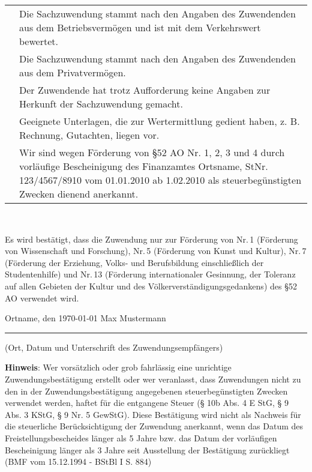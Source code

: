 \documentclass[12pt,ngerman]{scrartcl}
\newcommand{\yes}{\scalebox{1.5}{\XBox}} %
\newcommand{\no}{\scalebox{1.5}{\Square}}
\newcommand{\MyFormBox}[3][1.0cm]{%
    \begin{mdframed}[style=MyFormStyle]%
    {\noindent\footnotesize#2 \vspace*{1em} \par\normalsize #3}\vspace*{#1}%
    \end{mdframed}%
}
\begin{document}
{\footnotesize
\begin{tabular}{cp{}}
\hspace{1em} \yes & Die Sachzuwendung stammt nach den Angaben des Zuwendenden aus dem Betriebsvermögen und ist mit dem Verkehrswert bewertet.  \\
\hspace{1em} \no & Die Sachzuwendung stammt nach den Angaben des Zuwendenden aus dem Privatvermögen.  \\
\hspace{1em} \no & Der Zuwendende hat trotz Aufforderung keine Angaben zur Herkunft der Sachzuwendung gemacht. \\
\hspace{1em} \yes & Geeignete Unterlagen, die zur Wertermittlung gedient haben, z. B. Rechnung, Gutachten, liegen vor. \\
\hspace{1em} \yes & Wir sind wegen Förderung von §52 AO Nr. 1, 2, 3 und 4 durch vorläufige Bescheinigung des Finanzamtes Ortsname, StNr. 123/4567/8910 vom 01.01.2010 ab 1.02.2010 als steuerbegünstigten Zwecken dienend anerkannt. 
\end{tabular}}

\MyFormBox[0.1cm]{~}%
{
Es wird bestätigt, dass die Zuwendung nur zur Förderung von Nr.\,1 (Förderung von Wissenschaft und Forschung), Nr.\,5 (Förderung von Kunst und Kultur), Nr.\,7 (Förderung der Erziehung, Volks- und Berufsbildung einschließlich der Studentenhilfe) und Nr.\,13 (Förderung internationaler Gesinnung, der Toleranz auf allen Gebieten der Kultur und des Völkerverständigungsgedankens) des §52 AO verwendet wird.
}

\vspace*{2.25em}
{\footnotesize Ortname, den \today \hspace*{20em} Max Mustermann}

\hrule

\vspace*{0.5em} (Ort, Datum und Unterschrift des Zuwendungsempfängers) 

{\singlespacing \scriptsize \textbf{Hinweis}: \newline
Wer vorsätzlich oder grob fahrlässig eine unrichtige Zuwendungsbestätigung erstellt oder wer veranlasst, dass Zuwendungen nicht
zu den in der Zuwendungsbestätigung angegebenen steuerbegünstigten Zwecken verwendet werden, haftet für die entgangene Steuer (§ 10b Abs. 4 E StG, § 9 Abs. 3 KStG, § 9 Nr. 5 GewStG). Diese Bestätigung wird nicht als Nachweis für die steuerliche Berücksichtigung der Zuwendung anerkannt, wenn das Datum des Freistellungsbescheides länger als 5 Jahre bzw. das Datum der vorläufigen Bescheinigung länger als 3 Jahre seit Ausstellung der Bestätigung zurückliegt (BMF vom 15.12.1994 - BStBl I S. 884)}
\end{document}
